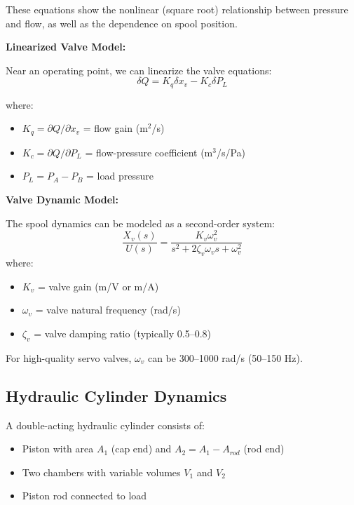 These equations show the nonlinear (square root) relationship between pressure and flow, as well as the dependence on spool position.

\textbf{Linearized Valve Model:}

Near an operating point, we can linearize the valve equations:
\begin{equation}
    \delta Q = K_q \delta x_v - K_c \delta P_L
\end{equation}

where:
\begin{itemize}
    \item $K_q = \partial Q / \partial x_v$ = flow gain (m$^2$/s)
    \item $K_c = \partial Q / \partial P_L$ = flow-pressure coefficient (m$^3$/s/Pa)
    \item $P_L = P_A - P_B$ = load pressure
\end{itemize}

\textbf{Valve Dynamic Model:}

The spool dynamics can be modeled as a second-order system:
\begin{equation}
    \frac{X_v(s)}{U(s)} = \frac{K_v \omega_v^2}{s^2 + 2\zeta_v \omega_v s + \omega_v^2}
    \label{eq:valve_dynamics}
\end{equation}
where:
\begin{itemize}
    \item $K_v$ = valve gain (m/V or m/A)
    \item $\omega_v$ = valve natural frequency (rad/s)
    \item $\zeta_v$ = valve damping ratio (typically 0.5--0.8)
\end{itemize}

For high-quality servo valves, $\omega_v$ can be 300--1000 rad/s (50--150 Hz).

\subsection{Hydraulic Cylinder Dynamics}

A double-acting hydraulic cylinder consists of:
\begin{itemize}
    \item Piston with area $A_1$ (cap end) and $A_2 = A_1 - A_{rod}$ (rod end)
    \item Two chambers with variable volumes $V_1$ and $V_2$
    \item Piston rod connected to load
\end{itemize}

